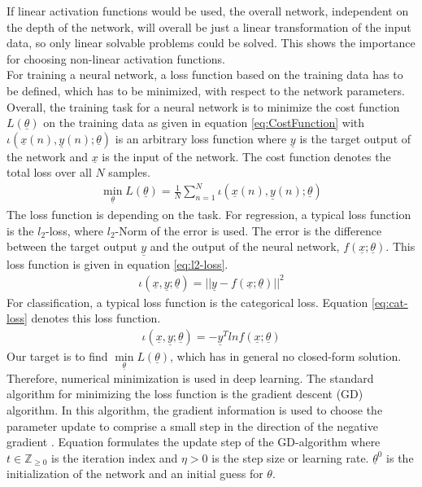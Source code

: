\documentclass[12pt,DIV14,BCOR12mm,a4paper,footexclude,headinclude,halfparskip-,twoside,openright,openany,cleardoubleempty,idxtotoc,bibtotoc]{scrreprt} %
\numberwithin{equation}{chapter}
\begin{document}
If linear activation functions would be used, the overall network, independent on the depth of the network, will overall be just a linear transformation of the input data, so only linear solvable problems could be solved. This shows the importance for choosing non-linear activation functions.\\
For training a neural network, a loss function based on the training data has to be defined, which has to be minimized, with respect to the network parameters. 
Overall, the training task for a neural network is to minimize the cost function $L(\underline{\theta})$ on the training data as given in equation \ref{eq:CostFunction} with $\iota(\underline{x}(n),\underline{y}(n);\underline{\theta})$ is an arbitrary loss function where $\underline{y}$ is the target output of the network and $\underline{x}$ is the input of the network. The cost function denotes the total loss over all $N$ samples.
\begin{align}
	\underset{\underline{\theta}}\min L(\underline{\theta}) = \frac{1}{N}\sum_{n=1}^{N}\iota(\underline{x}(n),\underline{y}(n);\underline{\theta})  \label{eq:CostFunction}
\end{align}
The loss function is depending on the task. For regression, a typical loss function is the $l_{2}$-loss, where $l_{2}$-Norm of the error is used. The error is the difference between the target output $\underline{y}$ and the output of the neural network, $f(\underline{x};\underline{\theta})$. This loss function is given in equation \ref{eq:l2-loss}.
\begin{align}
	\iota(\underline{x},\underline{y};\underline{\theta}) = ||\underline{y}-f(\underline{x};\underline{\theta})||^{2}\label{eq:l2-loss}
\end{align}
For classification, a typical loss function is the categorical loss. Equation \ref{eq:cat-loss} denotes this loss function.
\begin{align}
	\iota(\underline{x},\underline{y};\underline{\theta}) = -\underline{y}^{T}ln f(\underline{x};\underline{\theta})\label{eq:cat-loss}
\end{align}
Our target is to find $\underset{\underline{\theta}}\min L(\underline{\theta})$, which has in general no closed-form solution. Therefore, numerical minimization is used in deep learning. The standard algorithm for minimizing the loss function is the gradient descent (GD) algorithm. In this algorithm, the gradient information is used to choose the parameter update to comprise a small step in the direction of the negative gradient \cite{Bishop}. Equation formulates the update step of the GD-algorithm where $t \in \mathbb{Z}_{\geq0}$ is the iteration index and $\eta > 0$ is the step size or learning rate. $\underline{\theta}^{0}$ is the initialization of the network and an initial guess for $\theta$.
\end{document}
